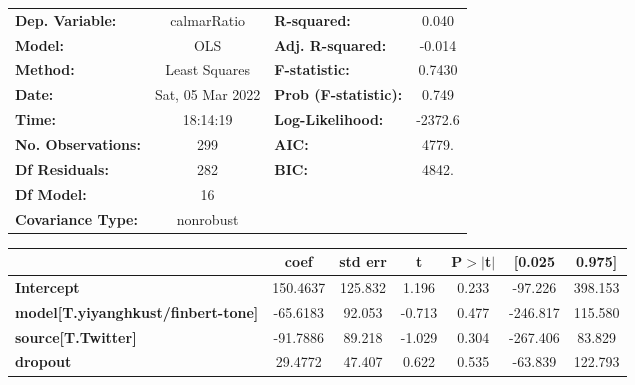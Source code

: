 \begin{center}
\begin{tabular}{lclc}
\toprule
\textbf{Dep. Variable:}                    &   calmarRatio    & \textbf{  R-squared:         } &     0.040   \\
\textbf{Model:}                            &       OLS        & \textbf{  Adj. R-squared:    } &    -0.014   \\
\textbf{Method:}                           &  Least Squares   & \textbf{  F-statistic:       } &    0.7430   \\
\textbf{Date:}                             & Sat, 05 Mar 2022 & \textbf{  Prob (F-statistic):} &    0.749    \\
\textbf{Time:}                             &     18:14:19     & \textbf{  Log-Likelihood:    } &   -2372.6   \\
\textbf{No. Observations:}                 &         299      & \textbf{  AIC:               } &     4779.   \\
\textbf{Df Residuals:}                     &         282      & \textbf{  BIC:               } &     4842.   \\
\textbf{Df Model:}                         &          16      & \textbf{                     } &             \\
\textbf{Covariance Type:}                  &    nonrobust     & \textbf{                     } &             \\
\bottomrule
\end{tabular}
\begin{tabular}{lcccccc}
                                           & \textbf{coef} & \textbf{std err} & \textbf{t} & \textbf{P$> |$t$|$} & \textbf{[0.025} & \textbf{0.975]}  \\
\midrule
\textbf{Intercept}                         &     150.4637  &      125.832     &     1.196  &         0.233        &      -97.226    &      398.153     \\
\textbf{model[T.yiyanghkust/finbert-tone]} &     -65.6183  &       92.053     &    -0.713  &         0.477        &     -246.817    &      115.580     \\
\textbf{source[T.Twitter]}                 &     -91.7886  &       89.218     &    -1.029  &         0.304        &     -267.406    &       83.829     \\
\textbf{dropout}                           &      29.4772  &       47.407     &     0.622  &         0.535        &      -63.839    &      122.793     \\

\end{tabular}
\end{center}

